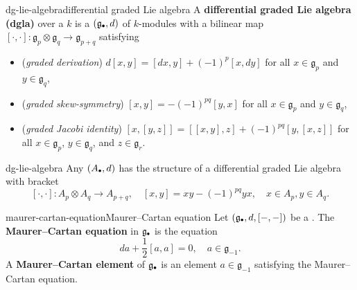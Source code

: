\begin{topic}{dg-lie-algebra}{differential graded Lie algebra}
    A \textbf{differential graded Lie algebra (dgla)} over a  $k$ is a  $(\mathfrak{g}_\bdot, d)$ of $k$-modules with a bilinear map $[\cdot, \cdot] : \mathfrak{g}_p \otimes \mathfrak{g}_q \to \mathfrak{g}_{p + q}$ satisfying
    \begin{itemize}
        \item (\textit{graded derivation}) $d[x, y] = [dx, y] + (-1)^p [x, dy]$ for all $x \in \mathfrak{g}_p$ and $y \in \mathfrak{g}_q$,
        \item (\textit{graded skew-symmetry}) $[x, y] = -(-1)^{pq} [y, x]$ for all $x \in \mathfrak{g}_p$ and $y \in \mathfrak{g}_q$,
        \item (\textit{graded Jacobi identity}) $[x, [y, z]] = [[x, y], z] + (-1)^{pq} [y, [x, z]]$ for all $x \in \mathfrak{g}_p$, $y \in \mathfrak{g}_q$, and $z \in \mathfrak{g}_r$.
    \end{itemize}
\end{topic}

\begin{example}{dg-lie-algebra}
    Any  $(A_\bdot, d)$ has the structure of a differential graded Lie algebra with bracket
    \[ [\cdot, \cdot] : A_p \otimes A_q \to A_{p + q}, \quad [x, y] = xy - (-1)^{pq} yx, \quad x \in A_p, y \in A_q . \]
\end{example}

\begin{topic}{maurer-cartan-equation}{Maurer--Cartan equation}
    Let $(\mathfrak{g}_\bdot, d, [-, -])$ be a . The \textbf{Maurer--Cartan equation} in $\mathfrak{g}_\bdot$ is the equation
    \[ da + \frac{1}{2} [a, a] = 0, \quad a \in \mathfrak{g}_{-1} . \]
    A \textbf{Maurer--Cartan element} of $\mathfrak{g}_\bdot$ is an element $a \in \mathfrak{g}_{-1}$ satisfying the Maurer--Cartan equation.
\end{topic}

